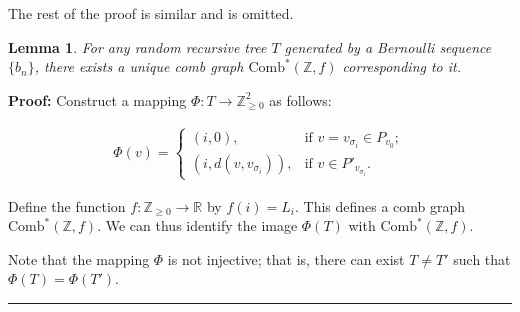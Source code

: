 \documentclass[10pt,twoside]{article}
\newtheorem{lemma}[theorem]{Lemma}
\renewenvironment{proof}[1]{\noindent\textbf{#1}}{\ \rule{0.5em}{0.5em}}
\begin{document}
 
The rest of the proof is similar and is omitted.


\begin{lemma}\label{lem3}
For any random recursive tree $T$ generated by a Bernoulli sequence $\{b_n\}$, there exists a unique comb graph $\mathrm{Comb}^*(\mathbb{Z}, f)$ corresponding to it.
\end{lemma}

\begin{proof}
P\textbf{roof: }Construct a mapping $\Phi: T \to \mathbb{Z}_{\geq 0}^2$ as follows:
 

\begin{eqnarray}
\Phi(v) =
\begin{cases}
(i, 0), & \text{if } v = v_{\sigma_i} \in P_{v_0}; \\
(i, d(v, v_{\sigma_i})), & \text{if } v \in P'_{v_{\sigma_i}}.
\end{cases}
\end{eqnarray}

 
Define the function $f: \mathbb{Z}_{\geq 0} \to \mathbb{R}$ by $f(i) = L_i$. This defines a comb graph $\mathrm{Comb}^*(\mathbb{Z}, f)$. We can thus identify the image $\Phi(T)$ with $\mathrm{Comb}^*(\mathbb{Z}, f)$.

Note that the mapping $\Phi$ is not injective; that is, there can exist $T \neq T'$ such that $\Phi(T) = \Phi(T')$.
\end{proof}
\end{document}
